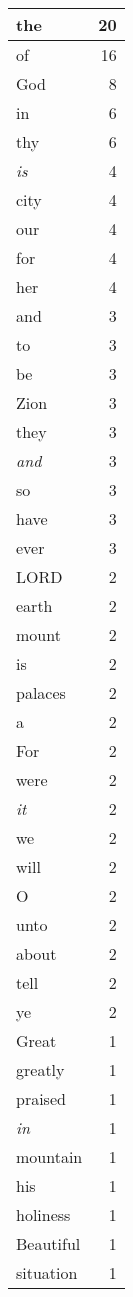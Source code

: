 \begin{center}
\begin{longtable}{l|r}
\hline \hline
\endlastfoot
the & 20 \\ \hline
of & 16 \\ \hline
God & 8 \\ \hline
in & 6 \\ \hline
thy & 6 \\ \hline
\emph{is} & 4 \\ \hline
city & 4 \\ \hline
our & 4 \\ \hline
for & 4 \\ \hline
her & 4 \\ \hline
and & 3 \\ \hline
to & 3 \\ \hline
be & 3 \\ \hline
Zion & 3 \\ \hline
they & 3 \\ \hline
\emph{and} & 3 \\ \hline
so & 3 \\ \hline
have & 3 \\ \hline
ever & 3 \\ \hline
LORD & 2 \\ \hline
earth & 2 \\ \hline
mount & 2 \\ \hline
is & 2 \\ \hline
palaces & 2 \\ \hline
a & 2 \\ \hline
For & 2 \\ \hline
were & 2 \\ \hline
\emph{it} & 2 \\ \hline
we & 2 \\ \hline
will & 2 \\ \hline
O & 2 \\ \hline
unto & 2 \\ \hline
about & 2 \\ \hline
tell & 2 \\ \hline
ye & 2 \\ \hline
Great & 1 \\ \hline
greatly & 1 \\ \hline
praised & 1 \\ \hline
\emph{in} & 1 \\ \hline
mountain & 1 \\ \hline
his & 1 \\ \hline
holiness & 1 \\ \hline
Beautiful & 1 \\ \hline
situation & 1 \\ \hline

\end{longtable}
\end{center}
